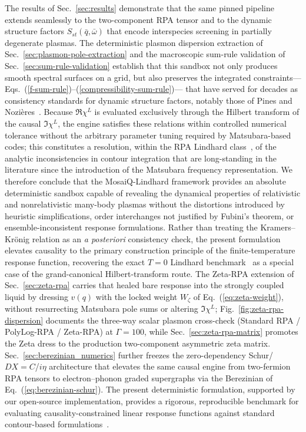 \documentclass[aps,showkeys,noshowpacs,superscriptaddress,pre,preprint]{revtex4-2}
\begin{document}
The results of Sec.~\ref{sec:results} demonstrate that the same pinned pipeline extends seamlessly
to the two-component RPA tensor and to the dynamic structure factors $S_{st}(\bar{q}, \bar{\omega})$
that encode interspecies screening in partially degenerate plasmas.
The deterministic plasmon dispersion extraction of Sec.~\ref{sec:plasmon-pole-extraction}
and the macroscopic sum-rule validation of Sec.~\ref{sec:sum-rule-validation}
establish that this sandbox not only produces smooth spectral surfaces on a grid,
but also preserves the integrated constraints---Eqs.~(\ref{f-sum-rule})--(\ref{compressibility-sum-rule})---
that have served for decades as consistency standards for dynamic structure factors, notably those of Pines and Nozi\`eres~\cite{Pines-Nozieres1989}.
Because $\Re \chi^L$ is evaluated exclusively through the Hilbert transform of the causal $\Im \chi^L$,
the engine satisfies these relations within controlled numerical tolerance
without the arbitrary parameter tuning required by Matsubara-based codes;
this constitutes a resolution, within the RPA Lindhard class~\cite{Lindhard1954},
of the analytic inconsistencies in contour integration that are long-standing in the literature
since the introduction of the Matsubara frequency representation.
We therefore conclude that the MosaiQ-Lindhard framework provides an absolute deterministic sandbox
capable of revealing the dynamical properties of relativistic and nonrelativistic many-body plasmas
without the distortions introduced by heuristic simplifications, order interchanges not justified by Fubini's theorem,
or ensemble-inconsistent response formulations.
Rather than treating the Kramers--Kr\"onig relation as an \emph{a posteriori} consistency check,
the present formulation elevates causality to the primary construction principle of the finite-temperature response function,
recovering the exact $T=0$ Lindhard benchmark~\cite{Lindhard1954} as a special case of the grand-canonical Hilbert-transform route.
The Zeta-RPA extension of Sec.~\ref{sec:zeta-rpa} carries that healed bare response into the strongly coupled liquid by dressing $v(q)$ with the locked weight $W_\zeta$ of Eq.~(\ref{eq:zeta-weight}), without resurrecting Matsubara pole sums or altering $\Im\chi^L$; Fig.~\ref{fig:zeta-rpa-dispersion} documents the three-way scalar plasmon cross-check (Standard RPA / PolyLog-RPA / Zeta-RPA) at $\Gamma=100$, while Sec.~\ref{sec:zeta-rpa-matrix} promotes the Zeta dress to the production two-component asymmetric zeta matrix.
Sec.~\ref{sec:berezinian_numerics} further freezes the zero-dependency Schur/$DX{=}C$/$i\eta$ architecture that elevates the same causal engine from two-fermion RPA tensors to electron--phonon graded supergraphs via the Berezinian of Eq.~(\ref{eq:berezinian-schur}).
The present deterministic formulation, supported by our open-source implementation,
provides a rigorous, reproducible benchmark for evaluating causality-constrained linear response functions
against standard contour-based formulations~\cite{Giuliani-Vignale2005,Gouedard-Deutsch1978}.
\end{document}
